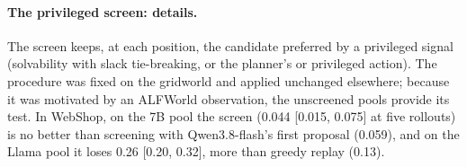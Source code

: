 \documentclass{article}
\theoremstyle{plain}
\theoremstyle{definition}
\theoremstyle{remark}
\begin{document}
\paragraph{The privileged screen: details.}
The screen keeps, at each position, the candidate preferred by a privileged signal (solvability with slack tie-breaking, or the planner's or privileged action). The procedure was fixed on the gridworld and applied unchanged elsewhere; because it was motivated by an ALFWorld observation, the unscreened pools provide its test. In WebShop, on the 7B pool the screen (0.044 [0.015, 0.075] at five rollouts) is no better than screening with Qwen3.8-flash's first proposal (0.059), and on the Llama pool it loses 0.26 [0.20, 0.32], more than greedy replay (0.13).
\end{document}
